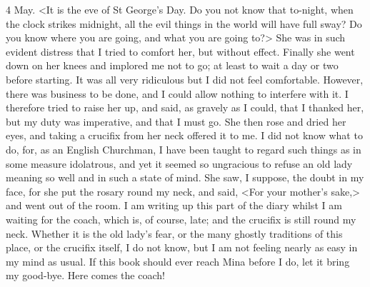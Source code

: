 \begin{diary}{4 May.}
<It is the eve of St George's Day. Do you not know that to-night, when the clock strikes midnight, all the evil things in the world will have full sway? Do you know where you are going, and what you are going to?> She was in such evident distress that I tried to comfort her, but without effect. Finally she went down on her knees and implored me not to go; at least to wait a day or two before starting. It was all very ridiculous but I did not feel comfortable. However, there was business to be done, and I could allow nothing to interfere with it. I therefore tried to raise her up, and said, as gravely as I could, that I thanked her, but my duty was imperative, and that I must go. She then rose and dried her eyes, and taking a crucifix from her neck offered it to me. I did not know what to do, for, as an English Churchman, I have been taught to regard such things as in some measure idolatrous, and yet it seemed so ungracious to refuse an old lady meaning so well and in such a state of mind. She saw, I suppose, the doubt in my face, for she put the rosary round my neck, and said, <For your mother's sake,> and went out of the room. I am writing up this part of the diary whilst I am waiting for the coach, which is, of course, late; and the crucifix is still round my neck. Whether it is the old lady's fear, or the many ghostly traditions of this place, or the crucifix itself, I do not know, but I am not feeling nearly as easy in my mind as usual. If this book should ever reach Mina before I do, let it bring my good-bye. Here comes the coach!
\end{diary}

